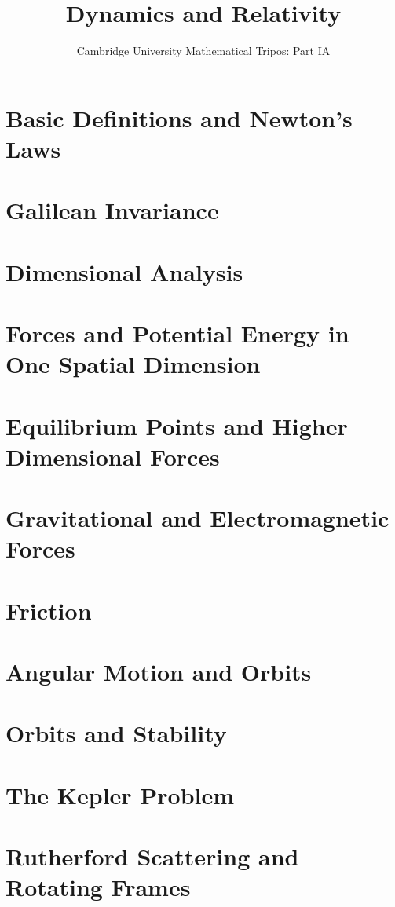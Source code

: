 \documentclass{article}
\title{Dynamics and Relativity}
\author{Cambridge University Mathematical Tripos: Part IA}
\begin{document}
\maketitle

\tableofcontentsnewpage

\section{Basic Definitions and Newton's Laws}

\section{Galilean Invariance}

\section{Dimensional Analysis}

\section{Forces and Potential Energy in One Spatial Dimension}

\section{Equilibrium Points and Higher Dimensional Forces}

\section{Gravitational and Electromagnetic Forces}

\section{Friction}

\section{Angular Motion and Orbits}

\section{Orbits and Stability}

\section{The Kepler Problem}

\section{Rutherford Scattering and Rotating Frames}

\end{document}

